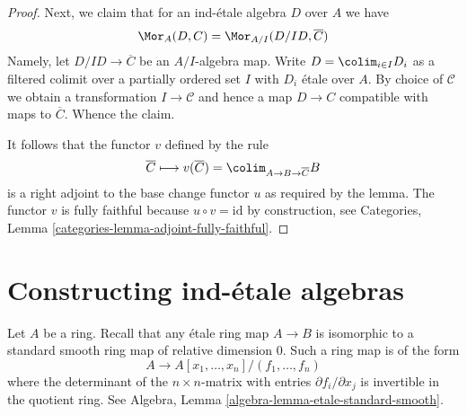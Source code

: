 \begin{proof}
\medskip\noindent
Next, we claim that for an ind-\'etale algebra $D$ over $A$ we have
$$
\Mor_A(D, C) = \Mor_{A/I}(D/ID, \overline{C})
$$
Namely, let $D/ID \to \overline{C}$ be an $A/I$-algebra map.
Write $D = \colim_{i \in I} D_i$ as a filtered colimit over
a partially ordered set $I$ with $D_i$ \'etale
over $A$. By choice of $\mathcal{C}$
we obtain a transformation $I \to \mathcal{C}$ and hence a map
$D \to C$ compatible with maps to $\overline{C}$. Whence the claim.

\medskip\noindent
It follows that the functor $v$ defined by the rule
$$
\overline{C} 
\longmapsto
v(\overline{C}) = \colim_{A \to B \to \overline{C}} B
$$
is a right adjoint to the base change functor $u$ as required by the lemma.
The functor $v$ is fully faithful because
$u \circ v = \text{id}$ by construction, see
Categories, Lemma \ref{categories-lemma-adjoint-fully-faithful}.
\end{proof}









\section{Constructing ind-\'etale algebras}
\label{section-construction-ind-etale}

\noindent
Let $A$ be a ring. Recall that any \'etale ring map $A \to B$ is isomorphic
to a standard smooth ring map of relative dimension $0$. Such a ring map
is of the form
$$
A \longrightarrow A[x_1, \ldots, x_n]/(f_1, \ldots, f_n)
$$
where the determinant of the $n \times n$-matrix with entries
$\partial f_i/\partial x_j$ is invertible in the quotient ring. See
Algebra, Lemma \ref{algebra-lemma-etale-standard-smooth}.

